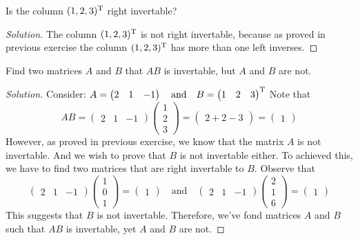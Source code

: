 \documentclass{article}
\begin{document}
\begin{exercise}
  Is the column $(1,2,3)^\mathrm{T}$ right invertable?
\end{exercise}
\begin{proof}[Solution]
  The column $(1,2,3)^\mathrm{T}$ is not right invertable, because
  as proved in previous exercise the column $(1,2,3)^\mathrm{T}$ has
  more than one left inverses.
\end{proof}
\begin{exercise}
  Find two matrices $A$ and $B$ that $AB$ is invertable, but
  $A$ and $B$ are not.
\end{exercise}
\begin{proof}[Solution]
  Consider:
  $ A=
    \begin{pmatrix}
      2&1&-1
    \end{pmatrix}
    \quad\text{and}\quad
    B=
    \begin{pmatrix}
      1&2&3
    \end{pmatrix}^\mathrm{T} $
    Note that
    \[
      AB=
    \begin{pmatrix}
      2&1&-1
    \end{pmatrix}
    \begin{pmatrix}
      1\\2\\3
    \end{pmatrix}=
    \begin{pmatrix}
      2+2-3
    \end{pmatrix}=
    \begin{pmatrix}
      1
    \end{pmatrix}
    \]
    However, as proved in previous exercise, we know that
    the matrix $A$ is not invertable. And we wish to prove that
    $B$ is not invertable either. To achieved this, we have to
    find two matrices that are right invertable to $B$. Observe that
    \[
      \begin{pmatrix}
        2&1&-1
      \end{pmatrix}
      \begin{pmatrix}
        1\\0\\1
      \end{pmatrix}=
      \begin{pmatrix}
        1
      \end{pmatrix}
      \quad\text{and}\quad
      \begin{pmatrix}
        2&1&-1
      \end{pmatrix}
      \begin{pmatrix}
        2\\1\\6
      \end{pmatrix}=
      \begin{pmatrix}
        1
      \end{pmatrix}
    \]
    This suggests that $B$ is not invertable. Therefore, we've fond
    matrices $A$ and $B$ such that $AB$ is invertable, yet 
    $A$ and $B$ are not.
\end{proof}
\end{document}

